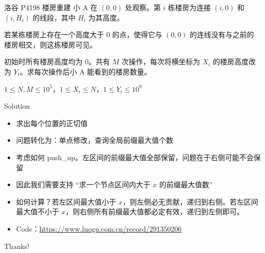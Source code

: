 ﻿\documentclass[aspectratio=169]{ctexbeamer}
\begin{document}
\begin{frame}{洛谷 P4198 楼房重建}
    小 A 在 $(0,0)$ 处观察。第 $i$ 栋楼房为连接 $(i,0)$ 和 $(i,H_i)$ 的线段，其中 $H_i$ 为其高度。

    若某栋楼房上存在一个高度大于 $0$ 的点，使得它与 $(0,0)$ 的连线没有与之前的楼房相交，则这栋楼房可见。

    初始时所有楼房高度均为 $0$。共有 $M$ 次操作，每次将横坐标为 $X_i$ 的楼房高度改为 $Y_i$。求每次操作后小 A 能看到的楼房数量。

    $1 \le N,M \le 10^5$，$1 \le X_i \le N$，$1 \le Y_i \le 10^9$
\end{frame}

\begin{frame}{Solution}
    \begin{itemize}
        \item 求出每个位置的正切值
        \item 问题转化为：单点修改，查询全局前缀最大值个数
        \item 考虑如何 push\_up。左区间的前缀最大值全部保留，问题在于右侧可能不会保留
        \item 因此我们需要支持 “求一个节点区间内大于 $x$ 的前缀最大值数”
        \item 如何计算？若左区间最大值小于 $x$，则左侧必无贡献，递归到右侧。若左区间最大值不小于 $x$，则右侧所有前缀最大值都必定有效，递归到左侧即可。
        \item Code：\url{https://www.luogu.com.cn/record/291350206}
    \end{itemize}
\end{frame}


\begin{frame}
    \begin{center}
        {\Huge\calligra Thanks!}
    \end{center}
\end{frame}
\end{document}
